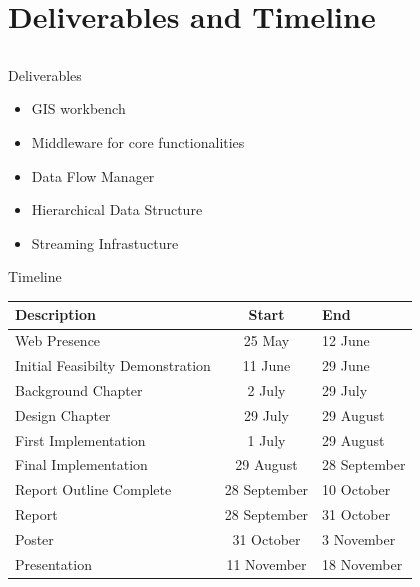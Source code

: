 \documentclass{beamer}
\begin{document}
\section{Deliverables and Timeline}
\subsection{}
\begin{frame}{Deliverables}

\begin{itemize}
\item GIS workbench
\item Middleware for core functionalities
\item Data Flow Manager
\item Hierarchical Data Structure
\item Streaming Infrastucture
\end{itemize}

\end{frame}

\begin{frame}{Timeline}


{\scriptsize
\begin{tabular}{l|c|l}
Description                      & Start             & End            \\
\hline \hline
Web Presence                     & 25 May            & 12 June        \\
\hline
Initial Feasibilty Demonstration & 11 June           & 29 June        \\
\hline
Background Chapter               & 2 July            & 29 July        \\
\hline
Design Chapter                   & 29 July           & 29 August      \\
\hline
First Implementation             & 1 July            & 29 August      \\
\hline
Final Implementation             & 29 August         & 28 September   \\
\hline
Report Outline Complete          & 28 September      & 10 October     \\
\hline
Report                           & 28 September      & 31 October     \\
\hline
Poster                           & 31 October        & 3 November     \\
\hline
Presentation                     & 11 November       & 18 November    \\
\end{tabular}}

\end{frame}
\end{document}
